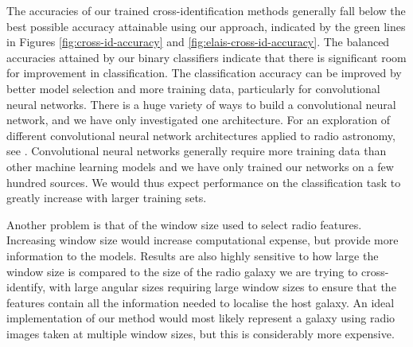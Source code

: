 \documentclass[fleqn,usenatbib,usedcolumn]{mnras}
\begin{document}
    The accuracies of our trained cross-identification methods generally fall
    below the best possible accuracy attainable using our approach, indicated
    by the green lines in Figures \ref{fig:cross-id-accuracy} and
    \ref{fig:elais-cross-id-accuracy}. The balanced accuracies attained by our
    binary classifiers indicate that there is significant room for improvement
    in classification. The classification accuracy can be improved by better
    model selection and more training data, particularly for convolutional
    neural networks. There is a huge variety of ways to build a convolutional
    neural network, and we have only investigated one architecture. For an
    exploration of different convolutional neural network architectures
    applied to radio astronomy, see \citet{lukic17compact}. Convolutional
    neural networks generally require more training data than other machine
    learning models and we have only trained our networks on a few hundred
    sources. We would thus expect performance on the classification task to
    greatly increase with larger training sets.

    Another problem is that of the window size used to select radio features.
    Increasing window size would increase computational expense, but provide
    more information to the models. Results are also highly sensitive to how
    large the window size is compared to the size of the radio galaxy we are
    trying to cross-identify, with large angular sizes requiring large window
    sizes to ensure that the features contain all the information needed to
    localise the host galaxy. An ideal implementation of our method would most
    likely represent a galaxy using radio images taken at multiple window
    sizes, but this is considerably more expensive.
\end{document}
